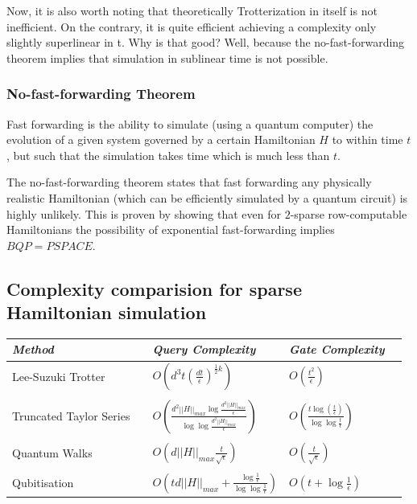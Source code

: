 \documentclass[
10pt, %
a4paper, %
oneside, %
headinclude,footinclude, %
BCOR5mm, %
]{scrartcl}
\begin{document}
Now, it is also worth noting that theoretically Trotterization in itself is not inefficient. On the contrary, it is quite efficient achieving a complexity only slightly superlinear in t. Why is that good? Well, because the no-fast-forwarding theorem implies that simulation in sublinear time is not possible.

\subsubsection{No-fast-forwarding Theorem}
Fast forwarding is the ability to simulate (using a quantum computer) the evolution of a given system governed by a certain Hamiltonian $H$ to within time $t$, but such that the simulation takes time which is much less than $t$.\newline

The no-fast-forwarding theorem states that fast forwarding any physically realistic Hamiltonian (which can be efficiently simulated by a quantum circuit) is highly unlikely. This is proven by showing that even for $2$-sparse row-computable Hamiltonians the possibility of exponential fast-forwarding implies $BQP = PSPACE$.

\subsection{Complexity comparision for sparse Hamiltonian simulation}
\begin{center}
\begin{tabular}{ *5l }   \toprule
\emph{Method} && \emph{Query Complexity} & \emph{Gate Complexity}  \\\midrule
Lee-Suzuki Trotter && $O\left(d^{3}t\left({\frac {dt}{\epsilon }}\right)^{{\frac {1}{2}}k}\right)$  & $O\left({\frac {t^{2}}{\epsilon }}\right)$\\ \\ 
Truncated Taylor Series && $O\left({\frac {d^{2}||H||_{max}\log {\frac {d^{2}||H||_{max}}{\epsilon }}}{\log \log {\frac {d^{2}||H||_{max}}{\epsilon }}}}\right)$ & $O\left({\frac {t\log\left({\frac {t}{\epsilon }}\right)}{\log \log {\frac {t}{\epsilon }}}}\right)$\\ \\
Quantum Walks && $O\left(d||H||_{max}{\frac {t}{\sqrt {\epsilon }}}\right)$ & $O\left({\frac {t}{\sqrt {\epsilon }}}\right)$\\ \\
Qubitisation && $O\left(td||H||_{max}+{\frac {\log {\frac {1}{\epsilon }}}{\log \log {\frac {1}{\epsilon }}}}\right)$ & $O\left(t+\log {\frac {1}{\epsilon }}\right)$\\
\bottomrule
\hline
\end{tabular}
\end{center}
\end{document}
